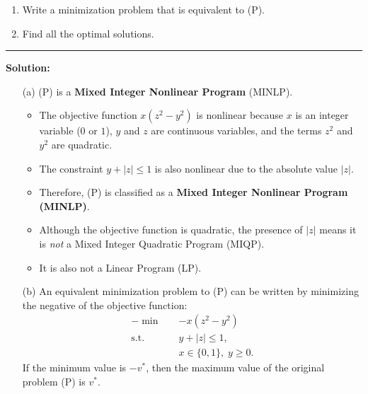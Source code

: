 \documentclass[11pt]{article}
\begin{document}
\begin{enumerate}[leftmargin=*, itemsep=1.5em]
\begin{enumerate}[leftmargin=*, itemsep=1.5em]
    \item Write a minimization problem that is equivalent to (P).
    
    \item Find all the optimal solutions.
\end{enumerate}

\vspace{0.5em}
\noindent\rule{\textwidth}{0.5pt}
\vspace{0.5em}

\noindent\textbf{Solution:}
\begin{enumerate}[leftmargin=*, itemsep=1.5em]
    \item[(a)] (P) is a \textbf{Mixed Integer Nonlinear Program} (MINLP).

    \begin{itemize}
        \item The objective function $x(z^2 - y^2)$ is nonlinear because $x$ is an integer variable ($0$ or $1$), $y$ and $z$ are continuous variables, and the terms $z^2$ and $y^2$ are quadratic.
        \item The constraint $y + |z| \le 1$ is also nonlinear due to the absolute value $|z|$.
        \item Therefore, (P) is classified as a \textbf{Mixed Integer Nonlinear Program (MINLP)}.
        \item Although the objective function is quadratic, the presence of $|z|$ means it is \emph{not} a Mixed Integer Quadratic Program (MIQP).
        \item It is also not a Linear Program (LP).
    \end{itemize}

    \item[(b)] An equivalent minimization problem to (P) can be written by minimizing the negative of the objective function:
    \begin{align*}
        -\min \quad & -x(z^2 - y^2) \\
        \text{s.t.}\quad & y + |z| \le 1, \\
        & x \in \{0,1\},\; y \ge 0.
    \end{align*}
    If the minimum value is $-v^\ast$, then the maximum value of the original problem (P) is $v^\ast$.


\end{enumerate}
\end{enumerate}
\end{document}
